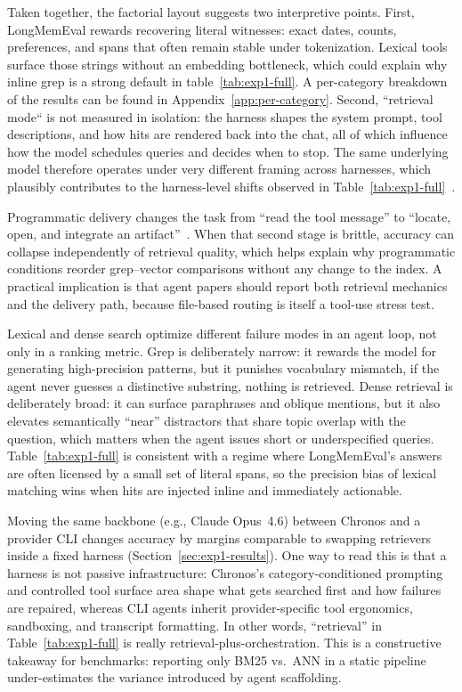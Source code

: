 \documentclass[sigconf,nonacm]{acmart}
\begin{document}
Taken together, the factorial layout suggests two interpretive points. First, LongMemEval rewards recovering literal witnesses: exact dates, counts, preferences, and spans that often remain stable under tokenization. Lexical tools surface those strings without an embedding bottleneck, which could explain why  inline grep is a strong default in table~\ref{tab:exp1-full}. A per-category breakdown of the results can be found in Appendix~\ref{app:per-category}. Second, ``retrieval mode`` is not measured in isolation: the harness shapes the system prompt, tool descriptions, and how hits are rendered back into the chat, all of which influence how the model schedules queries and decides when to stop. The same underlying model therefore operates under very different framing across harnesses, which plausibly contributes to the harness-level shifts observed in Table~\ref{tab:exp1-full}~\cite{yao2023react,sumers2023coala}.

Programmatic delivery changes the task from ``read the tool message'' to ``locate, open, and integrate an artifact''~\cite{packer2023memgpt}. When that second stage is brittle, accuracy can collapse independently of retrieval quality, which helps explain why programmatic conditions reorder grep--vector comparisons without any change to the index. A practical implication is that agent papers should report both retrieval mechanics and the delivery path, because file-based routing is itself a tool-use stress test.

Lexical and dense search optimize different failure modes in an agent loop, not only in a ranking metric. Grep is deliberately narrow: it rewards the model for generating high-precision patterns, but it punishes vocabulary mismatch, if the agent never guesses a distinctive substring, nothing is retrieved. Dense retrieval is deliberately broad: it can surface paraphrases and oblique mentions, but it also elevates semantically ``near'' distractors that share topic overlap with the question, which matters when the agent issues short or underspecified queries. Table~\ref{tab:exp1-full} is consistent with a regime where LongMemEval's answers are often licensed by a small set of literal spans, so the precision bias of lexical matching wins when hits are injected inline and immediately actionable.

Moving the same backbone (e.g., Claude Opus~4.6) between Chronos and a provider CLI changes accuracy by margins comparable to swapping retrievers inside a fixed harness (Section~\ref{sec:exp1-results}). One way to read this is that a harness is not passive infrastructure: Chronos's category-conditioned prompting~\cite{chronos} and controlled tool surface area shape what gets searched first and how failures are repaired, whereas CLI agents inherit provider-specific tool ergonomics, sandboxing, and transcript formatting. In other words, ``retrieval'' in Table~\ref{tab:exp1-full} is really retrieval-plus-orchestration. This is a constructive takeaway for benchmarks: reporting only BM25 vs.\ ANN in a static pipeline under-estimates the variance introduced by agent scaffolding.
\end{document}
